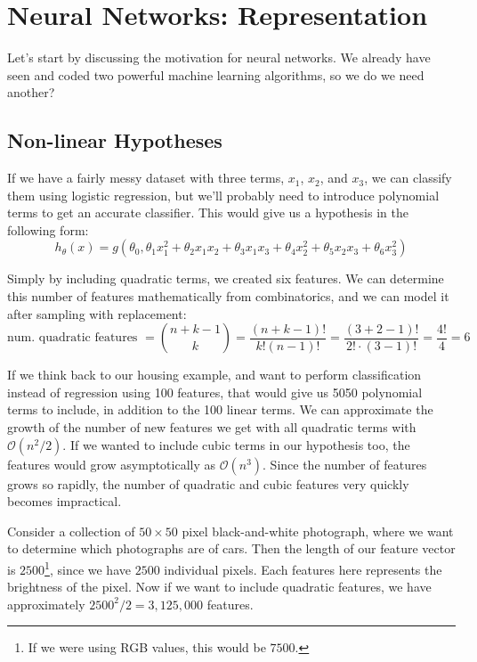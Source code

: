 \chapter{Neural Networks: Representation}
\label{chap:neural_net_repr}

Let's start by discussing the motivation for neural networks. We already have seen and coded two powerful machine learning algorithms, so we do we need another? 

\section{Non-linear Hypotheses}
If we have a fairly messy dataset with three terms, $x_1$, $x_2$, and $x_3$, we can classify them using logistic regression, but we'll probably need to introduce polynomial terms to get an accurate classifier. This would give us a hypothesis in the following form:
$$
h_\theta\left(x\right) = g\left(\theta_0, \theta_1 x_1^2 + \theta_2 x_1 x_2 + \theta_3 x_1 x_3 + \theta_4 x_2^2 + \theta_5 x_2 x_3 + \theta_6 x_3^2\right)
$$

Simply by including quadratic terms, we created six features. We can determine this number of features mathematically from combinatorics, and we can model it after sampling with replacement:
\begin{equation}
\text{num. quadratic features } = \binom{n+k-1}{k} = \frac{\left( n + k - 1\right) !}{k! \left(n-1\right)!} = \frac{\left(3 + 2 - 1\right)!}{2! \cdot \left(3-1\right)!} = \frac{4!}{4} = 6
\end{equation}

If we think back to our housing example, and want to perform classification instead of regression using 100 features, that would give us 5050 polynomial terms to include, in addition to the 100 linear terms. We can approximate the growth of the number of new features we get with all quadratic terms with $\mathcal{O}\left(n^2 / 2\right)$. If we wanted to include cubic terms in our hypothesis too, the features would grow asymptotically as $\mathcal{O}\left(n^3\right)$. Since the number of features grows so rapidly, the number of quadratic and cubic features very quickly becomes impractical. 

Consider a collection of $50\times 50$ pixel black-and-white photograph, where we want to determine which photographs are of cars. Then the length of our feature vector is $2500$\footnote{If we were using RGB values, this would be $7500$.}, since we have $2500$ individual pixels. Each features here represents the brightness of the pixel. Now if we want to include quadratic features, we have approximately $2500^2 / 2 = 3,125,000$ features. 

